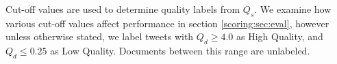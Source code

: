 Cut-off  values are used to determine quality labels from \(Q_s\).
We examine how various cut-off values affect performance in section \ref{scoring:sec:eval}, however unless otherwise stated, we label tweets with \(Q_d \geq 4.0\) as High Quality, and \(Q_d \leq 0.25\) as Low Quality.
Documents between this range are unlabeled.
